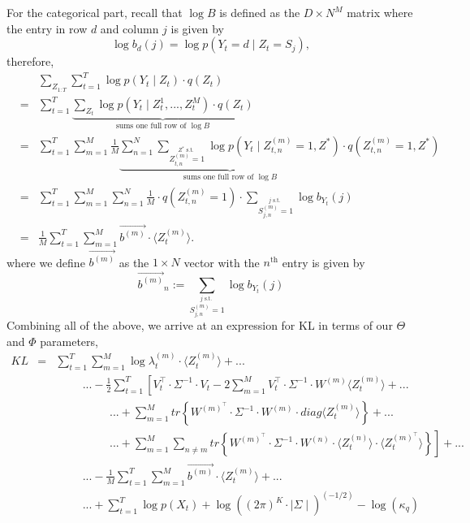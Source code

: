 \documentclass{amsart}
\begin{document}
For the categorical part, recall that $\log B$ is defined as the $D\times 
N^M$ matrix where the entry in row $d$ and column $j$ is given by 
\[
\log b_{d}(j) = \log p(Y_t = d\mid Z_t = S_j),
\]
therefore, 
\begin{eqnarray*}
&&\sum_{Z_{1:T}}\sum_{t=1}^T\log p(Y_t\mid Z_t)\cdot q(Z_t) \\
& = & 
\sum_{t=1}^T\underbrace{\sum_{Z_t}\log p(Y_t\mid Z_t^1,...,Z_t^M)\cdot 
q(Z_t)}_{\text{sums one full row of $\log B$}} \\
& = & 
\sum_{t=1}^T\sum_{m=1}^M\frac{1}{M}\underbrace{\sum_{n=1}^N
\sum_{\stackrel{Z^* \text{ s.t. } }{Z_{t,n}^{(m)} =1}}\log p(Y_t\mid Z_{t,n}^{(m)} = 
1,Z^*)}_{\text{sums one full row of $\log B$}}\cdot q(Z_{t,n}^{(m)} = 1,Z^*)\\
& = & 
\sum_{t=1}^T\sum_{m=1}^M\sum_{n=1}^N \frac{1}{M}\cdot q(Z_{t,n}^{(m)} = 1)\cdot
\sum_{\stackrel{j \text{ s.t. } }{S_{j,n}^{(m)} =1}}\log b_{Y_t}(j)\\
& = & 
\frac{1}{M}\sum_{t=1}^T\sum_{m=1}^M\overrightarrow{b^{(m)}}\cdot \langle Z_t^{(m)}\rangle.
\end{eqnarray*}
where we define $\overrightarrow{b^{(m)}}$ as the $1\times N$ vector
with the $n^\text{th}$ entry is given by
\[
\overrightarrow{b^{(m)}}_n := \sum_{\stackrel{j \text{ s.t. } }{S_{j,n}^{(m)} =1}}\log 
b_{Y_t}(j)
\]
Combining all of the above, we arrive at an expression for KL in terms 
of our $\Theta$ and $\Phi$ parameters, 
\begin{eqnarray*}
KL  & = & \sum_{t=1}^T\sum_{m=1}^M\log 
\lambda_{t}^{(m)}\cdot \langle Z_{t}^{(m)}\rangle +...\\
&  & \hspace{1cm}...-\frac{1}{2}\sum_{t=1}^T\left[V_t^\intercal\cdot \Sigma^{-1}\cdot 
V_t - 2\sum_{m=1}^M V_t^\intercal \cdot \Sigma^{-1}\cdot 
W^{(m)}\langle Z_t^{(m)} \rangle\right.+...\\
&&\hspace{2cm}...+\left.\sum_{m=1}^M tr\left\{W^{(m)^\intercal}\cdot \Sigma^{-1}\cdot 
W^{(m)}\cdot diag\langle Z_t^{(m)}\rangle\right\}\right.+...\\
&&\hspace{2cm}...+\left.\sum_{m=1}^M\sum_{n\neq m} 
tr\left\{W^{(m)^\intercal}\cdot \Sigma^{-1}\cdot W^{(n)}\cdot \langle 
Z_t^{(n)}\rangle\cdot \langle 
Z_t^{(m)^\intercal}\rangle\right\}\right]+...\\
&  & 
\hspace{1cm}...-\frac{1}{M}\sum_{t=1}^T\sum_{m=1}^M\overrightarrow{b^{(m)}}\cdot \langle Z_t^{(m)}\rangle +...\\
&  & 
\hspace{1cm}...+\sum_{t=1}^T\log p(X_t) + \log \left((2\pi)^K\cdot\mid 
\Sigma\mid\right)^{(-1/2)}- \log(\kappa_q)
\end{eqnarray*}
\end{document}

